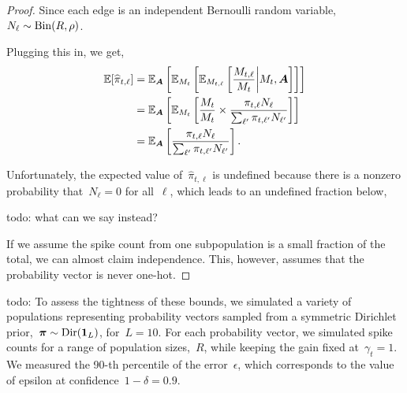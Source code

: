 \begin{proof}
Since each edge is an independent Bernoulli
  random variable,~$N_\ell \sim \mathrm{Bin}(R, \rho)$. 
  
  Plugging this in, we get,
  \begin{align}
    \mathbb{E}[\widehat{\pi}_{t, \ell}] &= \mathbb{E}_{\boldsymbol{A}}\left[ \mathbb{E}_{M_t} \left[ \mathbb{E}_{M_{t, \ell}} \left[\frac{M_{t, \ell}}{M_t} \bigg| M_t, \boldsymbol{A} \right] \right] \right] \\
    &= \mathbb{E}_{\boldsymbol{A}}\left[ \mathbb{E}_{M_t} \left[ \frac{ M_t}{M_t} \times 
      \frac{  \pi_{t, \ell} N_{\ell}}
      {\sum_{\ell'} \pi_{t, \ell'} N_{\ell'}} \right] \right] \\
    &= \mathbb{E}_{\boldsymbol{A}}\left[ \frac{ \pi_{t, \ell} N_{\ell}}
      {\sum_{\ell'} \pi_{t, \ell'} N_{\ell'}} \right].
  \end{align}

  Unfortunately, the expected value
  of~$\widehat{\pi}_{t, \ell}$ is undefined because there is a nonzero
  probability that~$N_\ell=0$ for all~$\ell$, which leads to an
  undefined fraction below,
  
  todo: what can we say instead?

  If we assume the spike count from one subpopulation is a small
  fraction of the total, we can almost claim independence. This,
  however, assumes that the probability vector is never one-hot. 

\end{proof}

todo: To assess the tightness of these bounds, we simulated a variety of 
populations representing probability vectors sampled from a symmetric
Dirichlet prior,~$\boldsymbol{\pi} \sim \mathrm{Dir}(\boldsymbol{1}_L)$, for~$L=10$. For each 
probability vector, we simulated spike counts for a range of 
population sizes,~$R$, while keeping the gain fixed at~$\gamma_t=1$.
We measured the 90-th percentile of the error~$\epsilon$, which 
corresponds to the value of epsilon at confidence~$1-\delta=0.9$.



